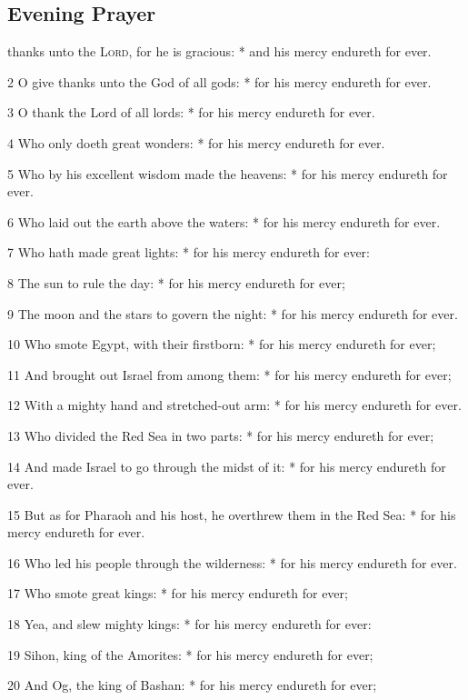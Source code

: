 \subsection{Evening Prayer}
 thanks unto the {\textsc{Lord}}, for he is gracious: * and his mercy endureth for ever.\par
2 O give thanks unto the God of all gods: * for his mercy endureth for ever.\par
3 O thank the Lord of all lords: * for his mercy endureth for ever.\par
4 Who only doeth great wonders: * for his mercy endureth for ever.\par
5 Who by his excellent wisdom made the heavens: * for his mercy endureth for ever.\par
6 Who laid out the earth above the waters: * for his mercy endureth for ever.\par
7 Who hath made great lights: * for his mercy endureth for ever:\par
8 The sun to rule the day: * for his mercy endureth for ever;\par
9 The moon and the stars to govern the night: * for his mercy endureth for ever.\par
10 Who smote Egypt, with their firstborn: * for his mercy endureth for ever;\par
11 And brought out Israel from among them: * for his mercy endureth for ever;\par
12 With a mighty hand and stretched-out arm: * for his mercy endureth for ever.\par
13 Who divided the Red Sea in two parts: * for his mercy endureth for ever;\par
14 And made Israel to go through the midst of it: * for his mercy endureth for ever.\par
15 But as for Pharaoh and his host, he overthrew them in the Red Sea: * for his mercy endureth for ever.\par
16 Who led his people through the wilderness: * for his mercy endureth for ever.\par
17 Who smote great kings: * for his mercy endureth for ever;\par
18 Yea, and slew mighty kings: * for his mercy endureth for ever:\par
19 Sihon, king of the Amorites: * for his mercy endureth for ever;\par
20 And Og, the king of Bashan: * for his mercy endureth for ever;\par
